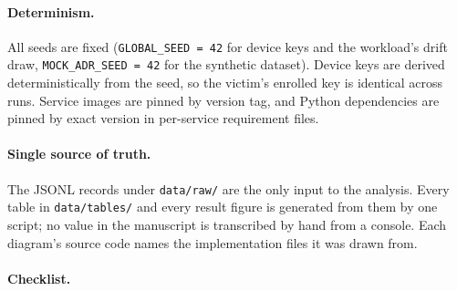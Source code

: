 \paragraph{Determinism.} All seeds are fixed (\texttt{GLOBAL\_SEED = 42} for device keys and the workload's drift draw, \texttt{MOCK\_ADR\_SEED = 42} for the synthetic dataset). Device keys are derived deterministically from the seed, so the victim's enrolled key is identical across runs. Service images are pinned by version tag, and Python dependencies are pinned by exact version in per-service requirement files.

\paragraph{Single source of truth.} The JSONL records under \texttt{data/raw/} are the only input to the analysis. Every table in \texttt{data/tables/} and every result figure is generated from them by one script; no value in the manuscript is transcribed by hand from a console. Each diagram's source code names the implementation files it was drawn from.

\paragraph{Checklist.}

